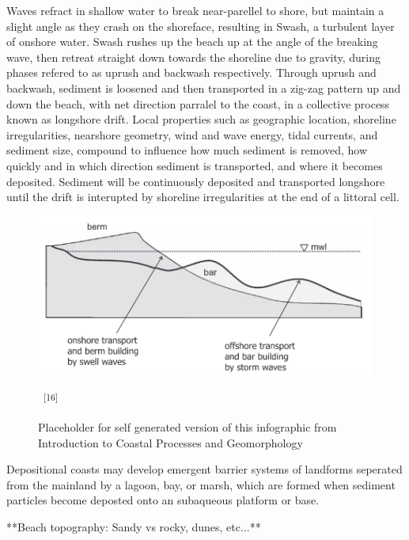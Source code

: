 \documentclass{article}
\begin{document}
{\par{Waves refract in shallow water to break near-parellel to shore, but maintain a slight angle as they crash on the shoreface, resulting in Swash, a turbulent layer of onshore water. Swash rushes up the beach up at the angle of the breaking wave, then retreat straight down towards the shoreline due to gravity, during phases refered to as uprush and backwash respectively. Through uprush and backwash, sediment is loosened and then transported in a zig-zag pattern up and down the beach, with net direction parralel to the coast, in a collective process known as longshore drift. Local properties such as geographic location, shoreline irregularities, nearshore geometry, wind and wave energy, tidal currents, and sediment size, compound to influence how much sediment is removed, how quickly and in which direction sediment is transported, and where it becomes deposited. Sediment will be continuously deposited and transported longshore until the drift is interupted by shoreline irregularities at the end of a littoral cell.}

\newpage
{}
\fancyfoot[C]{\thepage} 
\thispagestyle{fancy}

\begin{figure}
    \centering
    \includegraphics[width=.9\linewidth]{images/barred-profile.png}
    \caption{Placeholder for self generated version of this infographic from Introduction to Coastal Processes and Geomorphology} ~\textsuperscript{[16]}
    \label{figure8}
\end{figure}

\par{Depositional coasts may develop emergent barrier systems of landforms seperated from the mainland by a lagoon, bay, or marsh, which are formed when sediment particles become deposted onto an subaqueous platform or base. }

\newpage 
\par{**Beach topography: Sandy vs rocky, dunes, etc...**}

}
\end{document}
